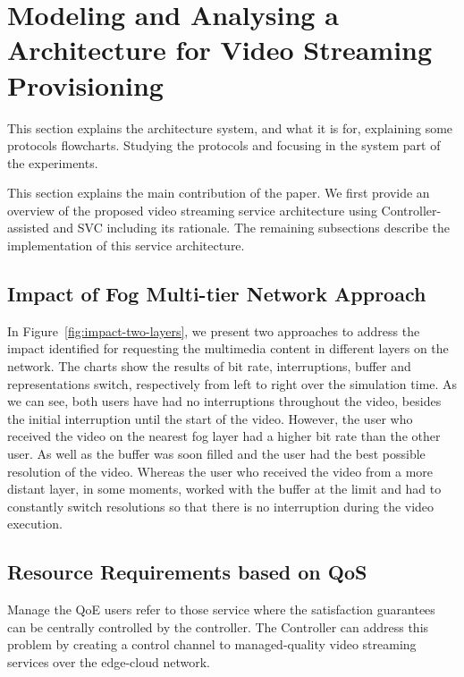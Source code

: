 \section{Modeling and Analysing a Architecture for Video Streaming Provisioning}
\label{sec:system-archi}

{\color{blue} This section explains the architecture system, and what it is  for, explaining some protocols flowcharts. Studying the protocols and focusing in the system part of the experiments.}

This section explains the main contribution of the paper. We first provide an overview of the proposed video streaming service architecture using Controller-assisted and SVC including its rationale. The remaining subsections describe the implementation of this service architecture.

\subsection{Impact of Fog Multi-tier Network Approach}

In Figure~\ref{fig:impact-two-layers}, we present two approaches to address the impact identified for requesting the multimedia content in different layers on the network. The charts show the results of bit rate, interruptions, buffer and representations switch, respectively from left to right over the simulation time. As we can see, both users have had no interruptions throughout the video, besides the initial interruption until the start of the video. However, the user who received the video on the nearest fog layer had a higher bit rate than the other user. As well as the buffer was soon filled and the user had the best possible resolution of the video. Whereas the user who received the video from a more distant layer, in some moments, worked with the buffer at the limit and had to constantly switch resolutions so that there is no interruption during the video execution.

\subsection{Resource Requirements based on QoS}

Manage the QoE users refer to those service where the satisfaction guarantees can be centrally controlled by the controller. The Controller can address this problem by creating a control channel to managed-quality video streaming services over the edge-cloud network.

